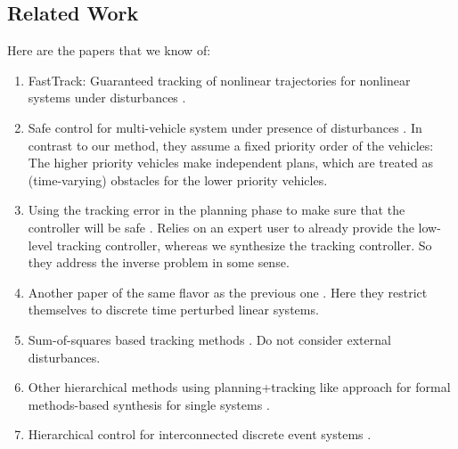 \subsection{Related Work}

Here are the papers that we know of:
\begin{enumerate}
	\item FastTrack: Guaranteed tracking of nonlinear trajectories for nonlinear systems under disturbances \cite{herbert2017fastrack}.
	\item Safe control for multi-vehicle system under presence of disturbances \cite{bansal2017safe}. In contrast to our method, they assume a fixed priority order of the vehicles: The higher priority vehicles make independent plans, which are treated as (time-varying) obstacles for the lower priority vehicles. 
	\item Using the tracking error in the planning phase to make sure that the controller will be safe \cite{fan2020fast}. Relies on an expert user to already provide the low-level tracking controller, whereas we synthesize the tracking controller. So they address the inverse problem in some sense.
	\item Another paper of the same flavor as the previous one \cite{fan2018controller}. Here they restrict themselves to discrete time perturbed linear systems.
	\item Sum-of-squares based tracking methods \cite{tedrake2010lqr, singh2018robust}. Do not consider external disturbances.
	\item Other hierarchical methods using planning+tracking like approach for formal methods-based synthesis for single systems \cite{wongpiromsarn2012receding, DBLP:journals/tac/MeyerD19, DBLP:journals/corr/abs-1911-09773}.
	\item Hierarchical control for interconnected discrete event systems \cite{wong1996hierarchical,schmidt2008nonblocking}.
\end{enumerate}